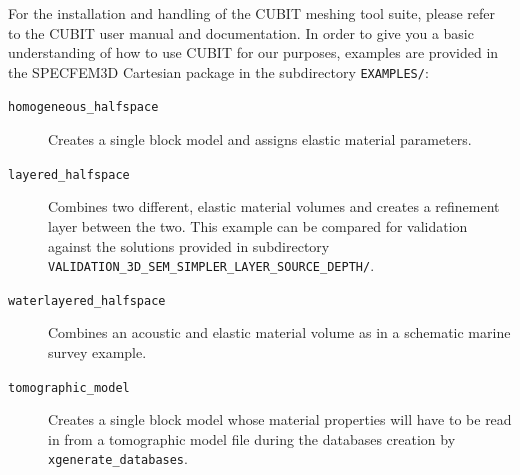 For the installation and handling of the CUBIT meshing tool suite,
please refer to the CUBIT user manual and documentation. In order
to give you a basic understanding of how to use CUBIT for our purposes,
examples are provided in the SPECFEM3D Cartesian package in the subdirectory
\texttt{EXAMPLES/}:
\begin{description}
\item [{\texttt{homogeneous\_halfspace}}] Creates a single block model
and assigns elastic material parameters.
\item [{\texttt{layered\_halfspace}}] Combines two different, elastic material
volumes and creates a refinement layer between the two. This example
can be compared for validation against the solutions provided in subdirectory
~\\
 \texttt{VALIDATION\_3D\_SEM\_SIMPLER\_LAYER\_SOURCE\_DEPTH/}.
\item [{\texttt{waterlayered\_halfspace}}] Combines an acoustic and elastic
material volume as in a schematic marine survey example.
\item [{\texttt{tomographic\_model}}] Creates a single block model whose
material properties will have to be read in from a tomographic model
file during the databases creation by \texttt{xgenerate\_databases}.
\end{description}
